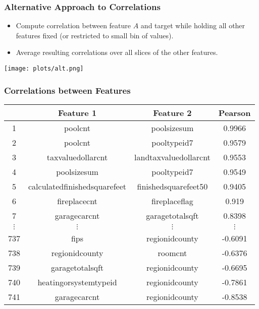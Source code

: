 \documentclass{beamer}
\begin{document}
\begin{frame}
\frametitle{Alternative Approach to Correlations}
\begin{itemize}
\item Compute correlation between feature $A$ and target while holding all other features fixed (or restricted to small bin of values).
\item Average resulting correlations over all slices of the other features.
\end{itemize}
\begin{center}
\texttt{[image: plots/alt.png]}
\end{center}
\end{frame}

\begin{frame}
\frametitle{Correlations between Features}
\begin{center}
\footnotesize
\begin{tabular}{|c|c|c|c|} \hline
\quad & Feature 1 & Feature 2 & Pearson \\ \hline
1 & poolcnt & poolsizesum & 0.9966 \\
2 & poolcnt & pooltypeid7 & 0.9579 \\
3 & taxvaluedollarcnt & landtaxvaluedollarcnt & 0.9553 \\
4 & poolsizesum & pooltypeid7 & 0.9549 \\
5 & calculatedfinishedsquarefeet & finishedsquarefeet50 & 0.9405 \\
6 & fireplacecnt & fireplaceflag & 0.919 \\
7 & garagecarcnt & garagetotalsqft & 0.8398 \\
$\vdots$ & $\vdots$ & $\vdots$ & $\vdots$ \\
737 & fips & regionidcounty & -0.6091 \\
738 & regionidcounty & roomcnt & -0.6376 \\
739 & garagetotalsqft & regionidcounty & -0.6695 \\
740 & heatingorsystemtypeid & regionidcounty & -0.7861 \\
741 & garagecarcnt & regionidcounty & -0.8538 \\
\hline
\end{tabular}
\end{center}
\end{frame}
\end{document}
